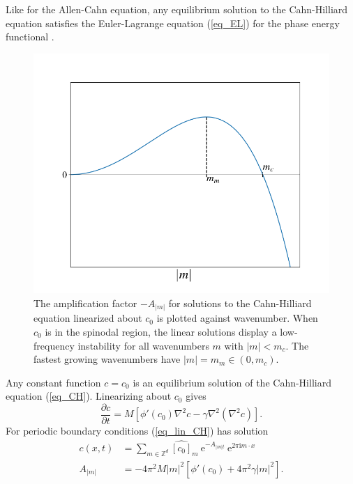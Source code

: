 \documentclass[12pt, reqno]{report}
\theoremstyle{definition}
\theoremstyle{remark}
\newcommand{\e}{\mathrm{e}}
\renewcommand{\i}{\mathrm{i}}
\begin{document}
Like for the Allen-Cahn equation, any equilibrium solution to the Cahn-Hilliard equation satisfies the Euler-Lagrange equation (\ref{eq_EL}) for the phase energy functional \cite{novickcohen_1984_nonlinear}.
\begin{figure}
    \centering

    \includegraphics[width = .4\paperwidth]{media_paper/lin_CH_amp.png}

    \caption{The amplification factor $-A_{|m|}$ for solutions to the Cahn-Hilliard equation linearized about $c_0$ is plotted against wavenumber. 
    When $c_0$ is in the spinodal region, the linear solutions display a low-frequency instability for all wavenumbers $m$ with $|m|<m_c$.
    The fastest growing wavenumbers have $|m|=m_m\in(0,m_c)$. \cite{copetti_1990_kinetics}}
    \label{fg_unstable_lin_CH}
\end{figure}
Any constant function $c=c_0$ is an equilibrium solution of the Cahn-Hilliard equation (\ref{eq_CH}).
Linearizing about $c_0$ gives
\begin{equation} \label{eq_lin_CH}
    \frac{\partial c}{\partial t}=M[\phi'(c_{0})\nabla ^{2}c-\gamma \nabla ^{2}(\nabla ^{2}c)].
\end{equation}
For periodic boundary conditions (\ref{eq_lin_CH}) has solution 
\begin{align}
    c(x,t)&=\sum_{m\in\mathbb{Z}^{d}}\widehat{[c_0]}_m~\e^{-A_{|m|t}}~\e^{2\pi\i m\cdot x}\\
    A_{|m|}&=-4\pi^2M|m|^2[\phi'(c_0)+4\pi^2\gamma|m|^2]
    .
\end{align}
\end{document}
